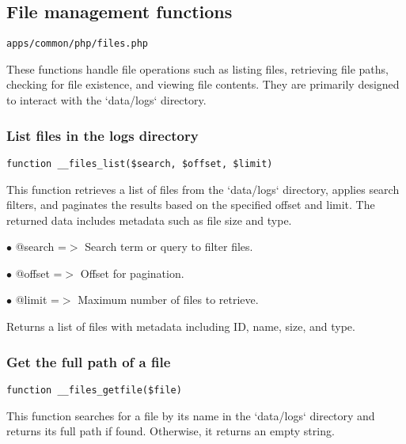 \documentclass[a4paper]{article}
\begin{document}
\hypertarget{toc29}{}
\subsection{File management functions}

\begin{lstlisting}
apps/common/php/files.php
\end{lstlisting}

These functions handle file operations such as listing files, retrieving file paths,
checking for file existence, and viewing file contents. They are primarily designed
to interact with the `data/logs` directory.

\hypertarget{toc30}{}
\subsubsection{List files in the logs directory}

\begin{lstlisting}
function __files_list($search, $offset, $limit)
\end{lstlisting}

This function retrieves a list of files from the `data/logs` directory, applies search filters,
and paginates the results based on the specified offset and limit. The returned data includes
metadata such as file size and type.

\begin{compactitem}
\item[\color{myblue}$\bullet$] @search =$>$ Search term or query to filter files.
\item[\color{myblue}$\bullet$] @offset =$>$ Offset for pagination.
\item[\color{myblue}$\bullet$] @limit  =$>$ Maximum number of files to retrieve.
\end{compactitem}

Returns a list of files with metadata including ID, name, size, and type.

\hypertarget{toc31}{}
\subsubsection{Get the full path of a file}

\begin{lstlisting}
function __files_getfile($file)
\end{lstlisting}

This function searches for a file by its name in the `data/logs` directory and returns
its full path if found. Otherwise, it returns an empty string.
\end{document}
